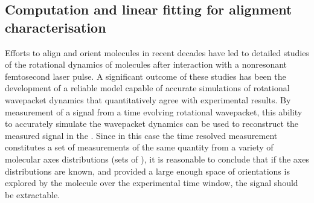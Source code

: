 \documentclass[letterpaper,table,10pt,english]{jupyterBook}
\begin{document}
\subsection{Computation and linear fitting for alignment characterisation}
\label{\detokenize{part1/numerics_070723:computation-and-linear-fitting-for-alignment-characterisation}}\label{\detokenize{part1/numerics_070723:sect-numerics-alignment-retrieval}}
\sphinxAtStartPar
Efforts to align and orient molecules in recent decades have led to detailed studies of the rotational dynamics of molecules after interaction with a non\sphinxhyphen{}resonant femtosecond laser pulse. A significant outcome of these studies has been the development of a reliable model capable of accurate simulations of rotational wavepacket dynamics that quantitatively agree with experimental results. By measurement of a signal from a time evolving rotational wavepacket, this ability to accurately simulate the wavepacket dynamics can be used to reconstruct the measured signal in the {\hyperref[\detokenize{backmatter/glossary:term-MF}]{}}. Since in this case the time resolved measurement constitutes a set of measurements of the same quantity from a variety of molecular axes distributions (sets of {\hyperref[\detokenize{backmatter/glossary:term-ADMs}]{}}), it is reasonable to conclude that if the axes distributions are known, and provided a large enough space of orientations is explored by the molecule over the experimental time window, the {\hyperref[\detokenize{backmatter/glossary:term-MF}]{}} signal should be extractable.
\end{document}

